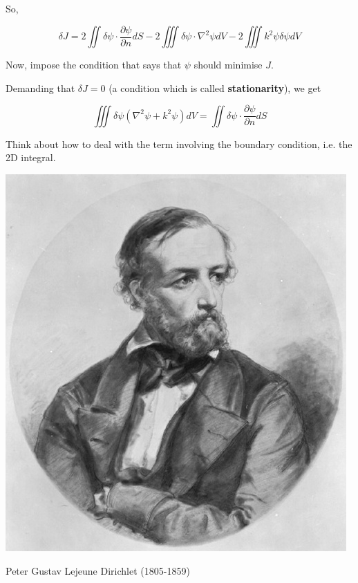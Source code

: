 So,

\begin{equation}
\delta J = 2\iint \delta \psi \cdot \frac{\partial \psi}{\partial n} dS - 2\iiint \delta \psi \cdot \nabla^2 \psi dV - 2 \iiint k^2 \psi \delta \psi dV
\end{equation} 

\begin{cue}
Now, impose the condition that says that $\psi$ should minimise $J$.  
\end{cue}

Demanding that $\delta J = 0$ (a condition which is called \textbf{stationarity}), we get

\begin{equation}
\iiint \delta \psi (\nabla^2 \psi + k^2 \psi ) dV = \iint \delta \psi \cdot \frac{\partial \psi}{\partial n} dS \label{eq-euler-lagrange-1}
\end{equation}

\begin{cue}
Think about how to deal with the term involving the boundary condition, i.e. the 2D integral.  
\end{cue}

\begin{marginfigure}[0.0cm]
  \includegraphics{numeric/figures/p_dirichlet}
  \caption{Peter Gustav Lejeune Dirichlet (1805-1859)}
\end{marginfigure}


